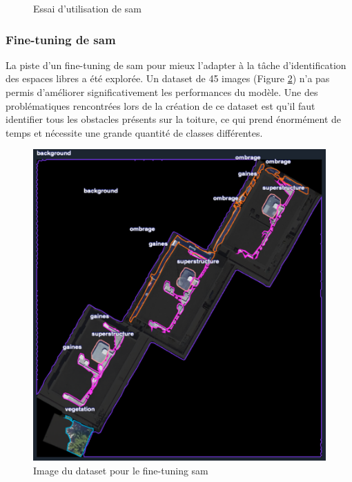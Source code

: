 \begin{figure}[H]
    \caption{Essai d'utilisation de \acrshort{sam}}
    \label{fig:essai_algo_sam}
\end{figure}

\subsubsection{Fine-tuning de \acrshort{sam}}
\label{subsubsec:fine_tuning_sam}
La piste d'un fine-tuning de \acrshort{sam} pour mieux l'adapter à la tâche d'identification des espaces libres a été explorée. Un dataset de 45 images (Figure \ref{fig:ch3_piste_exploree_classification_11_fine_tuning_dataset}) n'a pas permis d'améliorer significativement les performances du modèle. Une des problématiques rencontrées lors de la création de ce dataset est qu'il faut identifier tous les obstacles présents sur la toiture, ce qui prend énormément de temps et nécessite une grande quantité de classes différentes.

\begin{figure}[H]
    \centering
    \includegraphics[width=1\linewidth]{02-main/figures/ch3/ch3_piste_exploree_classification_11_fine_tuning_dataset.png}
    \caption{Image du dataset pour le fine-tuning \acrshort{sam}}
    \label{fig:ch3_piste_exploree_classification_11_fine_tuning_dataset}
\end{figure}

